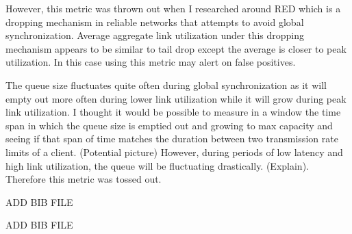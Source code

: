 \documentclass{article}
\begin{document}
	However, this metric was thrown out when I researched around RED which is a dropping mechanism in reliable networks that attempts to avoid global synchronization. Average aggregate link utilization under this dropping mechanism appears to be similar to tail drop except the average is closer to peak utilization. In this case using this metric may alert on false positives. \newline
	
	The queue size fluctuates quite often during global synchronization as it will empty out more often during lower link utilization while it will grow during peak link utilization. I thought it would be possible to measure in a window the time span in which the queue size is emptied out and growing to max capacity and seeing if that span of time matches the duration between two transmission rate limits of a client.
	(Potential picture)
	However, during periods of low latency and high link utilization, the queue will be fluctuating drastically. (Explain). Therefore this metric was tossed out.

\begin{thebibliography}{9}
ADD BIB FILE

ADD BIB FILE
\end{thebibliography}
\end{document}
